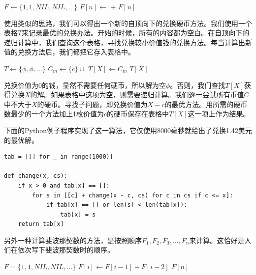 \documentclass[UTF8]{article}
\begin{document}
\begin{algorithmic}[1]
\State $F \gets \{1, 1, NIL, NIL, ...\}$
    \State $F[n] \gets$  $+$ 
  \EndIf
  \State \Return $F[n]$
\EndFunction
\end{algorithmic}

使用类似的思路，我们可以得出一个新的自顶向下的兑换硬币方法。我们使用一个表格$T$来记录最优的兑换办法。开始的时候，所有的内容都为空白。在自顶向下的递归计算中，我们查询这个表格，寻找兑换较小价值钱的兑换方法。每当计算出新值的兑换方法后，我们都把它存入表格中。

\begin{algorithmic}[1]
\State $T \gets \{\phi, \phi, ...\}$
        \State $C_m \gets \{c\} \cup$ 
          \State $T[X] \gets C_m$
        \EndIf
      \EndIf
    \EndFor
  \EndIf
  \State \Return $T[X]$
\EndFunction
\end{algorithmic}

兑换价值为0的钱，显然不需要任何硬币，所以解为空$\phi$。否则，我们查找$T[X]$获得兑换$X$的解。如果表格中这项为空，则需要递归计算。我们逐一尝试所有币值$C$中不大于$X$的硬币。寻找子问题，即兑换价值为$X-c$的最优方法。用所需的硬币数最少的一个方法加上1枚价值为$c$的硬币保存在表格中$T[X]$这一项上作为结果。

下面的Python例子程序实现了这一算法，它仅使用8000毫秒就给出了兑换1.42美元的最优解。

\lstset{language=Python}
\begin{lstlisting}
tab = [[] for _ in range(1000)]

def change(x, cs):
    if x > 0 and tab[x] == []:
        for s in [[c] + change(x - c, cs) for c in cs if c <= x]:
            if tab[x] == [] or len(s) < len(tab[x]):
                tab[x] = s
    return tab[x]
\end{lstlisting}

另外一种计算斐波那契数的方法，是按照顺序$F_1, F_2, F_3, ..., F_n$来计算。这恰好是人们在依次写下斐波那契数时的顺序。

\begin{algorithmic}[1]
  \State $F = \{1, 1, NIL, NIL, ...\}$
    \State $F[i] \gets F[i-1] + F[i-2]$
  \EndFor
  \State \Return $F[n]$
\EndFunction
\end{algorithmic}
\end{document}
